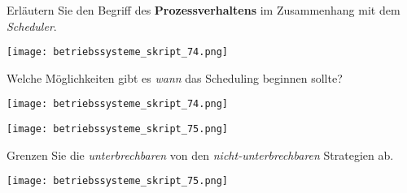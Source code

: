 \documentclass{article}
\begin{document}
\begin{tcolorbox}[colback=white!10!white,colframe=lightgray!75!black,
  savelowerto=\jobname_ex.tex,breakable,enhanced,lines before break=40]

\justifying
Erläutern Sie den Begriff des \textbf{Prozessverhaltens} im Zusammenhang mit dem \textit{Scheduler}.

\tcblower

\justifying
\begin{center}
\texttt{[image: betriebssysteme\_skript\_74.png]}
\end{center}

\end{tcolorbox}
\begin{tcolorbox}[colback=white!10!white,colframe=lightgray!75!black,
  savelowerto=\jobname_ex.tex,breakable,enhanced,lines before break=40]

\justifying
Welche Möglichkeiten gibt es \textit{wann} das Scheduling beginnen sollte?

\tcblower

\justifying
\begin{center}
\texttt{[image: betriebssysteme\_skript\_74.png]}
\end{center}
\begin{center}
\texttt{[image: betriebssysteme\_skript\_75.png]}
\end{center}

\end{tcolorbox}
\begin{tcolorbox}[colback=white!10!white,colframe=lightgray!75!black,
  savelowerto=\jobname_ex.tex,breakable,enhanced,lines before break=40]

\justifying
Grenzen Sie die \textit{unterbrechbaren} von den \textit{nicht-unterbrechbaren} Strategien ab.

\tcblower

\justifying
\begin{center}
\texttt{[image: betriebssysteme\_skript\_75.png]}
\end{center}

\end{tcolorbox}
\end{document}
